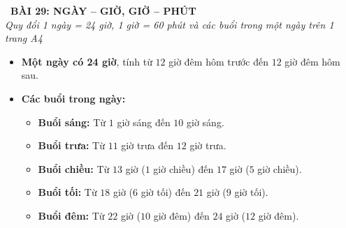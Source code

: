 \documentclass[11pt,a4paper]{article}
\begin{document}
\begin{tcolorbox}[
  enhanced,
  colback=violet!8!white,
  colframe=violet!70!black,
  arc=3mm, boxrule=1.2pt,
  left=3mm, right=3mm, top=2mm, bottom=2mm,
  halign=center
]
  {\LARGE\bfseries\color{violet!90!black}\faBookmark\ BÀI 29: NGÀY -- GIỜ, GIỜ -- PHÚT}\\[1mm]
  {\itshape\footnotesize\color{black!75} Quy đổi 1 ngày = 24 giờ, 1 giờ = 60 phút và các buổi trong một ngày trên 1 trang A4}
\end{tcolorbox}

\vspace{-2mm}

\noindent
\begin{minipage}[t]{0.49\textwidth}\vspace{0pt}
\begin{tcolorbox}[
  enhanced,
  colback=violet!4!white,
  colframe=violet!75!black,
  arc=2mm, boxrule=0.8pt,
  left=2mm, right=2mm, top=1.8mm, bottom=1.8mm,
  title={\footnotesize\bfseries\color{white}\faKey\ 1. Ngày và Giờ}
]
{\footnotesize
\begin{itemize}\setlength{\itemsep}{1pt}\setlength{\leftskip}{-2.5mm}
  \item \textbf{Một ngày có 24 giờ}, tính từ $12$ giờ đêm hôm trước đến $12$ giờ đêm hôm sau.
  \item \textbf{Các buổi trong ngày:}
  \begin{itemize}\setlength{\itemsep}{0.5pt}\setlength{\leftskip}{-2.5mm}
    \item \textbf{Buổi sáng:} Từ $1$ giờ sáng đến $10$ giờ sáng.
    \item \textbf{Buổi trưa:} Từ $11$ giờ trưa đến $12$ giờ trưa.
    \item \textbf{Buổi chiều:} Từ $13$ giờ ($1$ giờ chiều) đến $17$ giờ ($5$ giờ chiều).
    \item \textbf{Buổi tối:} Từ $18$ giờ ($6$ giờ tối) đến $21$ giờ ($9$ giờ tối).
    \item \textbf{Buổi đêm:} Từ $22$ giờ ($10$ giờ đêm) đến $24$ giờ ($12$ giờ đêm).
  \end{itemize}
\end{itemize}
}
\end{tcolorbox}
\end{minipage}
\hfill
\end{document}

